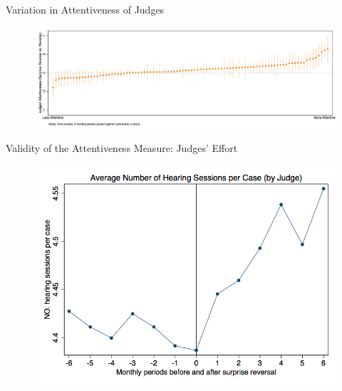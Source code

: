 \begin{frame}{Variation in Attentiveness of Judges}
    \begin{figure}
        \centering
        \includegraphics[height = 0.6 \textheight]{images/surp_reverse.png}
    \end{figure}
\end{frame}


\begin{frame}{Validity of the Attentiveness Measure: Judges' Effort}
    \begin{figure}
        \centering
        \includegraphics[height = 0.7 \textheight]{images/hearing_num.png}
    \end{figure}
\end{frame}

